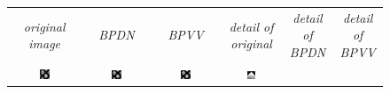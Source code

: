 \documentclass[twocolumn,oneside]{IEEEtran/IEEEtran}
\begin{document}
\noindent 
\begingroup \setlength{\tabcolsep}{1pt}
\begin{figure}[htbp]
  \centering
  \begin{tabular}{cccccc}
    \textit{\small original image} & \textit{\small BPDN} & \textit{\small BPVV} & \textit{\small detail of original} & \textit{\small detail of BPDN} & \textit{\small detail of BPVV} \\
    \includegraphics[width=0.16\textwidth]{figures-SBA/anothergrating_gt_framed}
                                   & \includegraphics[width=0.16\textwidth]{figures-SBA/anothergrating_40mu}		
                                                          & \includegraphics[width=0.16\textwidth]{figures-SBA/anothergrating_bptv_40mu}	
                                                                                 & \includegraphics[width=0.16\textwidth]{figures-SBA/anothergrating_gt_zoomin}	

\end{tabular}
\end{figure}
\end{document}
